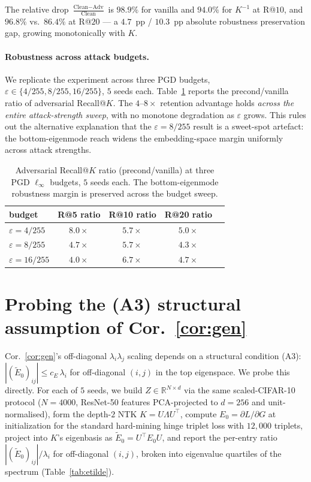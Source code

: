 \documentclass{article}
\newcommand{\R}{\mathbb{R}}
\newcommand{\E}{E}
\newcommand{\Etilde}{\widetilde{\E}}
\begin{document}
The relative drop $\frac{\text{Clean}-\text{Adv}}{\text{Clean}}$ is
$98.9\%$ for vanilla and $94.0\%$ for $K^{-1}$ at R@$10$, and
$96.8\%$ vs.\ $86.4\%$ at R@$20$ --- a $4.7$~pp / $10.3$~pp absolute
robustness preservation gap, growing monotonically with $K$.

\paragraph{Robustness across attack budgets.}
We replicate the experiment across three PGD budgets,
$\varepsilon \in \{4/255, 8/255, 16/255\}$, $5$ seeds each.
Table~\ref{tab:adv-sweep} reports the precond/vanilla ratio of
adversarial Recall@$K$. The $4$--$8\times$ retention advantage holds
\emph{across the entire attack-strength sweep}, with no monotone
degradation as $\varepsilon$ grows. This rules out the alternative
explanation that the $\varepsilon\!=\!8/255$ result is a sweet-spot
artefact: the bottom-eigenmode reach widens the embedding-space
margin uniformly across attack strengths.

\begin{table}[!htbp]
\centering
\small
\caption{Adversarial Recall@$K$ ratio (precond/vanilla) at three PGD
$\ell_\infty$ budgets, $5$ seeds each. The bottom-eigenmode robustness
margin is preserved across the budget sweep.}
\label{tab:adv-sweep}
\begin{tabular}{lcccc}
\toprule
budget & R@5 ratio & R@10 ratio & R@20 ratio \\
\midrule
$\varepsilon\!=\!4/255$  & $\mathbf{8.0\times}$ & $5.7\times$ & $5.0\times$ \\
$\varepsilon\!=\!8/255$  & $4.7\times$ & $\mathbf{5.7\times}$ & $4.3\times$ \\
$\varepsilon\!=\!16/255$ & $4.0\times$ & $\mathbf{6.7\times}$ & $4.7\times$ \\
\bottomrule
\end{tabular}
\end{table}

\section{Probing the (A3) structural assumption of Cor.~\ref{cor:gen}}
\label{app:etilde-diag}

Cor.~\ref{cor:gen}'s off-diagonal $\lambda_i\lambda_j$ scaling depends
on a structural condition (A3): $|(\Etilde_0)_{ij}| \leq c_E\,\lambda_i$
for off-diagonal $(i,j)$ in the top eigenspace. We probe this directly.
For each of $5$ seeds, we build $Z\in\R^{N\times d}$ via the same
scaled-CIFAR-10 protocol ($N{=}4000$, ResNet-50 features
PCA-projected to $d{=}256$ and unit-normalised), form the depth-$2$
NTK $K = U\Lambda U^\top$, compute
$\E_0 = \partial L/\partial G$ at initialization for the standard
hard-mining hinge triplet loss with $12{,}000$ triplets, project into
$K$'s eigenbasis as $\Etilde_0 = U^\top \E_0 U$, and report the
per-entry ratio $|(\Etilde_0)_{ij}|/\lambda_i$ for off-diagonal
$(i,j)$, broken into eigenvalue quartiles of the spectrum
(Table~\ref{tab:etilde}).
\end{document}

